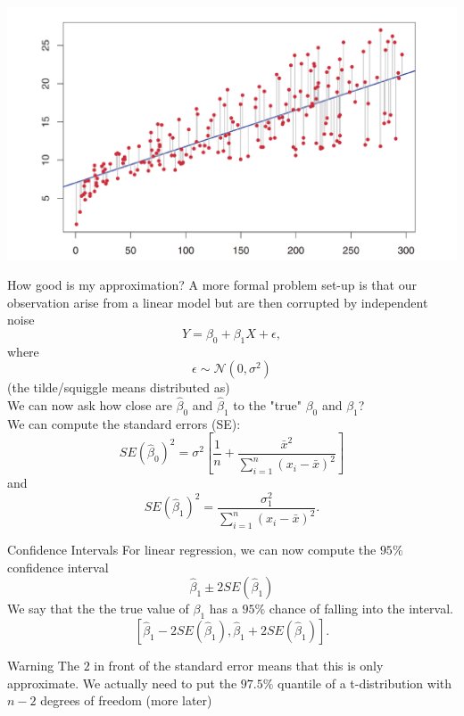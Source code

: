 \documentclass{bredelebeamer}
\begin{document}
\begin{frame}
\includegraphics[width=1\textwidth]{linearregression}
\end{frame}
\begin{frame}{How good is my approximation?}
A more formal problem set-up is that our observation arise from a linear model but are then corrupted by independent noise
\begin{equation}
Y = \beta_0 + \beta_1X + \epsilon,
\end{equation}
where 
\begin{equation}
\epsilon \sim \mathcal{N}(0, \sigma^2)
\end{equation}
(the tilde/squiggle means distributed as)
\\
We can now ask how close are $\hat{\beta}_0$ and $\hat{\beta}_1$ to the "true" $\beta_0$ and $\beta_1$?
\\
We can compute the standard errors (SE):
\begin{equation}
SE(\hat{\beta}_0)^2 = \sigma^2\left[\frac{1}{n} + \frac{\bar{x}^2}{\sum_{i = 1}^{n}(x_i - \bar{x})^2} \right]
\end{equation}
and
\begin{equation}
SE(\hat{\beta}_1)^2 =  \frac{\sigma_1^2}{\sum_{i =1 }^{n}(x_i - \bar{x})^2}.
\end{equation}

\end{frame}

\begin{frame}{Confidence Intervals}
For linear regression, we can now compute the $95\%$ confidence interval
\begin{equation}
\hat{\beta}_1 \pm 2 SE(\hat{\beta}_1)
\end{equation}
We say that the the true value of $\beta_1$ has a $95 \%$ chance of falling into the interval.
\begin{equation}
\left[\hat{\beta}_1 - 2 SE(\hat{\beta}_1), \hat{\beta}_1 + 2 SE(\hat{\beta}_1)\right].
\end{equation}

\begin{alertblock}{Warning}
	The $2$ in front of the standard error means that this is only approximate. We actually need to put the $97.5\%$ quantile of a t-distribution with $n-2$ degrees of freedom (more later)
\end{alertblock}

\end{frame}
\end{document}
